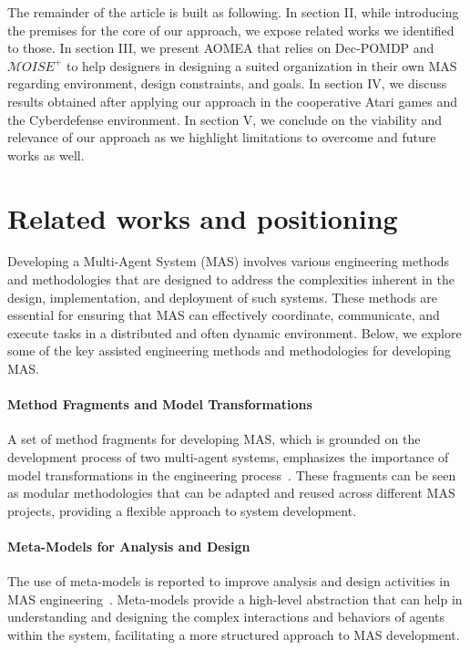 \documentclass[runningheads]{llncs}
\begin{document}
The remainder of the article is built as following.
In section II, while introducing the premises for the core of our approach, we expose related works we identified to those.
In section III, we present AOMEA that relies on Dec-POMDP and $\mathcal{M}OISE^+$ to help designers in designing a suited organization in their own MAS regarding environment, design constraints, and goals.
In section IV, we discuss results obtained after applying our approach in the cooperative Atari games and the Cyberdefense environment.
In section V, we conclude on the viability and relevance of our approach as we highlight limitations to overcome and future works as well.


\section{Related works and positioning}

Developing a Multi-Agent System (MAS) involves various engineering methods and methodologies that are designed to address the complexities inherent in the design, implementation, and deployment of such systems. These methods are essential for ensuring that MAS can effectively coordinate, communicate, and execute tasks in a distributed and often dynamic environment. Below, we explore some of the key assisted engineering methods and methodologies for developing MAS.

\paragraph{\textbf{Method Fragments and Model Transformations}}
A set of method fragments for developing MAS, which is grounded on the development process of two multi-agent systems, emphasizes the importance of model transformations in the engineering process~\cite{Garcia2011}. These fragments can be seen as modular methodologies that can be adapted and reused across different MAS projects, providing a flexible approach to system development.

\paragraph{\textbf{Meta-Models for Analysis and Design}}
The use of meta-models is reported to improve analysis and design activities in MAS engineering~\cite{Gomez2004}. Meta-models provide a high-level abstraction that can help in understanding and designing the complex interactions and behaviors of agents within the system, facilitating a more structured approach to MAS development.
\end{document}
